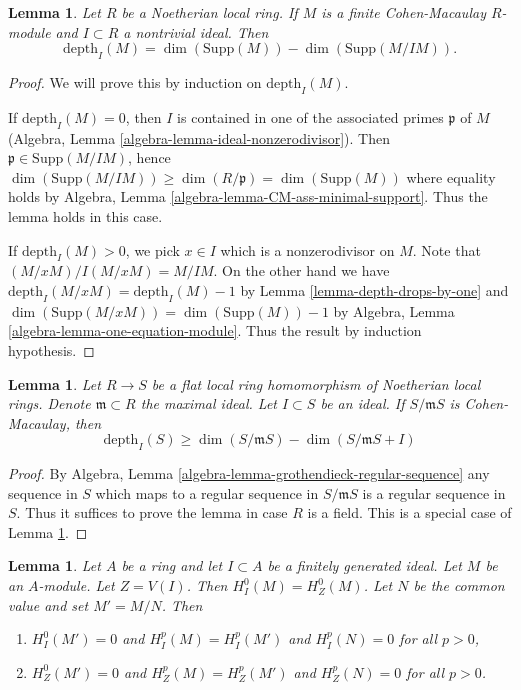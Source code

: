 \documentclass{stacks-project}
\theoremstyle{plain}
\newtheorem{lemma}[subsection]{Lemma}
\theoremstyle{definition}
\theoremstyle{remark}
\numberwithin{equation}{subsection}
\begin{document}
\begin{lemma}
\label{lemma-depth-CM}
Let $R$ be a Noetherian local ring. If $M$ is a finite Cohen-Macaulay
$R$-module and $I \subset R$ a nontrivial ideal. Then
$$
\text{depth}_I(M) = \dim(\text{Supp}(M)) - \dim(\text{Supp}(M/IM)).
$$
\end{lemma}

\begin{proof}
We will prove this by induction on $\text{depth}_I(M)$.

\medskip\noindent
If $\text{depth}_I(M) = 0$, then $I$ is contained in one
of the associated primes $\mathfrak p$ of $M$
(Algebra, Lemma \ref{algebra-lemma-ideal-nonzerodivisor}).
Then $\mathfrak p \in \text{Supp}(M/IM)$, hence
$\dim(\text{Supp}(M/IM)) \geq \dim(R/\mathfrak p) = \dim(\text{Supp}(M))$
where equality holds by
Algebra, Lemma \ref{algebra-lemma-CM-ass-minimal-support}.
Thus the lemma holds in this case.

\medskip\noindent
If $\text{depth}_I(M) > 0$, we pick $x \in I$ which is a
nonzerodivisor on $M$. Note that $(M/xM)/I(M/xM) = M/IM$.
On the other hand we have
$\text{depth}_I(M/xM) = \text{depth}_I(M) - 1$
by Lemma \ref{lemma-depth-drops-by-one}
and $\dim(\text{Supp}(M/xM)) = \dim(\text{Supp}(M)) -  1$
by Algebra, Lemma \ref{algebra-lemma-one-equation-module}.
Thus the result by induction hypothesis.
\end{proof}

\begin{lemma}
\label{lemma-depth-flat-CM}
Let $R \to S$ be a flat local ring homomorphism of Noetherian local
rings. Denote $\mathfrak m \subset R$ the maximal ideal.
Let $I \subset S$ be an ideal.
If $S/\mathfrak mS$ is Cohen-Macaulay, then
$$
\text{depth}_I(S) \geq \dim(S/\mathfrak mS) - \dim(S/\mathfrak mS + I)
$$
\end{lemma}

\begin{proof}
By Algebra, Lemma \ref{algebra-lemma-grothendieck-regular-sequence}
any sequence in $S$ which maps to a regular sequence in $S/\mathfrak mS$
is a regular sequence in $S$. Thus it suffices to prove the lemma
in case $R$ is a field. This is a special case of Lemma \ref{lemma-depth-CM}.
\end{proof}

\begin{lemma}
\label{lemma-divide-by-torsion}
Let $A$ be a ring and let $I \subset A$ be a finitely generated ideal.
Let $M$ be an $A$-module. Let $Z = V(I)$.
Then $H^0_I(M) = H^0_Z(M)$. Let $N$ be the common value and
set $M' = M/N$. Then
\begin{enumerate}
\item $H^0_I(M') = 0$ and $H^p_I(M) = H^p_I(M')$ and $H^p_I(N) = 0$
for all $p > 0$,
\item $H^0_Z(M') = 0$ and $H^p_Z(M) = H^p_Z(M')$ and $H^p_Z(N) = 0$
for all $p > 0$.
\end{enumerate}
\end{lemma}
\end{document}
